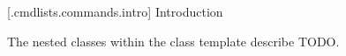 
 [\iotwod.cmdlists.commands.intro] {Introduction}

\pnum
The nested classes within the class template  describe TODO.

